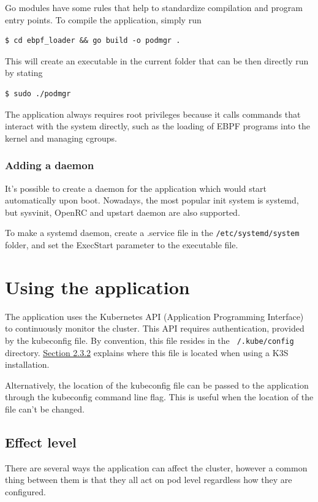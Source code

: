 \noindent
Go modules have some rules that help to standardize compilation and program entry points. To compile the application, simply run
\begin{verbatim}
$ cd ebpf_loader && go build -o podmgr .
\end{verbatim}

\noindent
This will create an executable in the current folder that can be then directly run by stating
\begin{verbatim}
$ sudo ./podmgr
\end{verbatim}
\noindent
The application always requires root privileges because it calls commands that interact with the system directly, such as the loading of EBPF programs into the kernel and managing cgroups.

\subsubsection{Adding a daemon}
It's possible to create a daemon for the application which would start automatically upon boot. Nowadays, the most popular init system is systemd, but sysvinit, OpenRC and upstart daemon are also supported.

To make a systemd daemon, create a .service file in the \texttt{/etc/systemd/system} folder, and set the ExecStart parameter to the executable file.

\newpage
\section{Using the application}
The application uses the Kubernetes API (Application Programming Interface) to continuously monitor the cluster. This API requires authentication, provided by the kubeconfig file. By convention, this file resides in the \texttt{~/.kube/config} directory. \underline{\hyperref[sec:k3syaml]{Section 2.3.2}} explains where this file is located when using a K3S installation.

Alternatively, the location of the kubeconfig file can be passed to the application through the kubeconfig command line flag. This is useful when the location of the file can't be changed.

\subsection{Effect level}
There are several ways the application can affect the cluster, however a common thing between them is that they all act on pod level regardless how they are configured. \\

